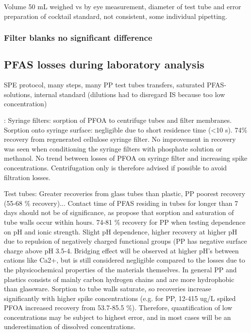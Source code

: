 Volume 50 mL weighed vs by eye measurement, diameter of test tube and error
preparation of cocktail standard, not consistent, some individual pipetting. 

\subsubsection{Filter blanks no significant difference}\label{subsec:FB}

\subsection{PFAS losses during laboratory analysis}
SPE protocol, many steps, many PP test tubes transfers, saturated PFAS-solutions, internal standard (dilutions had to disregard IS because too low concentration)

\citep{Lath2019labsorb}: 
Syringe filters: sorption of PFOA to centrifuge tubes and filter membranes. Sorption onto syringe surface: negligible due to short residence time (\textless 10 s). 74\% recovery from regenerated cellulose syringe filter. No improvement in recovery was seen when conditioning the syringe filters with phosphate solution or methanol. No trend between losses of PFOA on syringe filter and increasing spike concentrations. Centrifugation only is therefore advised if possible to avoid filtration losses. 

Test tubes: Greater recoveries from glass tubes than plastic, PP poorest recovery (55-68 \% recovery)... Contact time of PFAS residing in tubes for longer than 7 days should not be of significance, as \citep{Lath2019labsorb} propose that sorption and saturation of tube walls occur within hours. 74-81 \% recovery for PP when testing dependence on pH and ionic strength. Slight pH dependence, higher recovery at higher pH due to repulsion of negatively charged functional groups (PP has negative surface charge above pH 3.5-4. Bridging effect will be observed at higher pH's between cations like Ca2+, but is still considered negligible compared to the losses due to the physicochemical properties of the materials themselves. In general PP and plastics consists of mainly carbon hydrogen chains and are more hydrophobic than glassware. Sorption to tube walls saturate, so recoveries increase significantly with higher spike concentrations (e.g. for PP, 12-415 ug/L spiked PFOA increased recovery from 53.7-85.5 \%). Therefore, quantification of low concentrations may be subject to highest error, and in most cases will be an underestimation of dissolved concentrations. 

